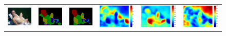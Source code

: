 \begin{figure}
\begin{tabular}{c c c c c c}

   \hline
   \includegraphics[height=0.10\linewidth]{fig/voc10_part/img/2008_000481.jpg} &
   \includegraphics[height=0.10\linewidth]{fig/voc10_part/res_baseline/2008_000481.png} &
   \includegraphics[height=0.10\linewidth]{fig/voc10_part/res_sharenet/2008_000481.png} &
   \includegraphics[height=0.10\linewidth]{fig/voc10_part/att1/2008_000481.pdf} &
   \includegraphics[height=0.10\linewidth]{fig/voc10_part/att2/2008_000481.pdf} &
   \includegraphics[height=0.10\linewidth]{fig/voc10_part/att3/2008_000481.pdf} \\

\end{tabular}
\end{figure}
